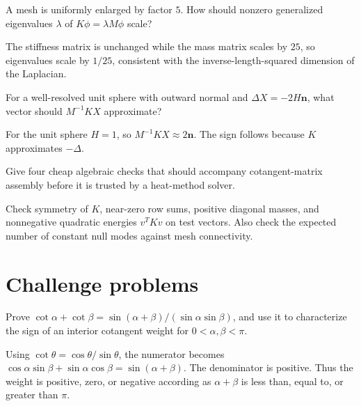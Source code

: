 \begin{problem}\label{prob:vii41-10}
A mesh is uniformly enlarged by factor \(5\).  How should nonzero generalized eigenvalues \(\lambda\) of \(K\phi=\lambda M\phi\) scale?
\end{problem}

\begin{solution}
The stiffness matrix is unchanged while the mass matrix scales by \(25\), so eigenvalues scale by \(1/25\), consistent with the inverse-length-squared dimension of the Laplacian.
\end{solution}

\begin{problem}\label{prob:vii41-11}
For a well-resolved unit sphere with outward normal and \(\Delta X=-2H\mathbf n\), what vector should \(M^{-1}KX\) approximate?
\end{problem}

\begin{solution}
For the unit sphere \(H=1\), so \(M^{-1}KX\approx2\mathbf n\).  The sign follows because \(K\) approximates \(-\Delta\).
\end{solution}

\begin{problem}\label{prob:vii41-12}
Give four cheap algebraic checks that should accompany cotangent-matrix assembly before it is trusted by a heat-method solver.
\end{problem}

\begin{solution}
Check symmetry of \(K\), near-zero row sums, positive diagonal masses, and nonnegative quadratic energies \(v^TKv\) on test vectors.  Also check the expected number of constant null modes against mesh connectivity.
\end{solution}


\section{Challenge problems}

\begin{problem}\label{prob:vii41-ch01}
Prove \(\cot\alpha+\cot\beta=\sin(\alpha+\beta)/(\sin\alpha\sin\beta)\), and use it to characterize the sign of an interior cotangent weight for \(0<\alpha,\beta<\pi\).
\end{problem}

\begin{solution}
Using \(\cot\theta=\cos\theta/\sin\theta\), the numerator becomes \(\cos\alpha\sin\beta+\sin\alpha\cos\beta=\sin(\alpha+\beta)\).  The denominator is positive.  Thus the weight is positive, zero, or negative according as \(\alpha+\beta\) is less than, equal to, or greater than \(\pi\).
\end{solution}

